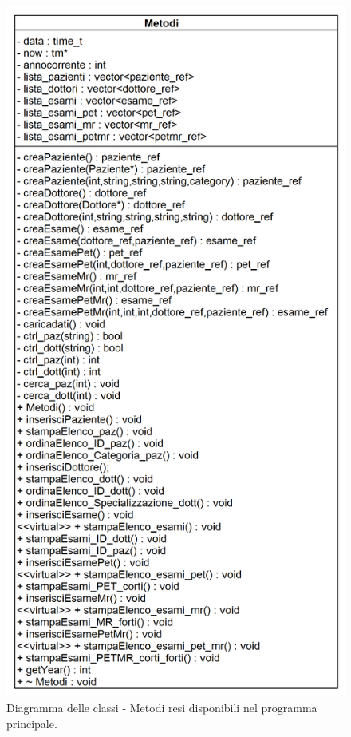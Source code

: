 \documentclass[a4paper,12pt]{article}
\begin{document}
\\
\begin{figure}[h]
 \centering
 \includegraphics[height=0.9\textheight]{diagrammiClassi/metodi}
 \caption{Diagramma delle classi - Metodi resi disponibili nel programma principale.}
\end{figure}




\end{document}

